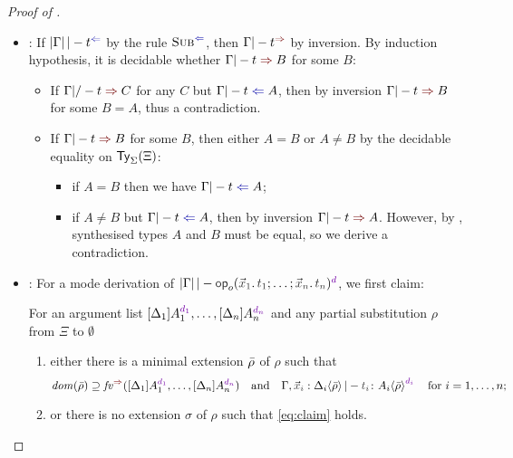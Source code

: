 \begin{proof}[Proof of {}]
\begin{itemize}
    \item {}: If $\erase{\Gamma} |-t^{\chk}$ by the rule $\ChkRule{Sub}$, then $\Gamma |- t^{\syn}$ by inversion.
      By induction hypothesis, it is decidable whether $\Gamma |- t \syn B$ for some $B$:
      \begin{itemize}
        \item If $\Gamma |/- t \syn C$ for any $C$ but $\Gamma |- t \chk A$, then by inversion $\Gamma |- t \syn B$ for some $B = A$, thus a contradiction.
        \item If $\Gamma |- t \syn B$ for some $B$, then either $A = B$ or $A \neq B$ by the decidable equality on $\mathsf{Ty}_{\Sigma}(\Xi)$: 
          \begin{itemize}
            \item if $A = B$ then we have\/ $\Gamma |- t \chk A$;
            \item if $A \neq B$ but $\Gamma |- t \chk A$, then by inversion $\Gamma |- t \syn A$.
              However, by , synthesised types $A$ and $B$ must be equal, so we derive a contradiction.
          \end{itemize}
      \end{itemize}
    \item {}:
      For a mode derivation of $\erase{\Gamma} |- \tmOpts^{\dir{d}}$, we first claim:
      \begin{claim}\label{lem:args-induction}
        For an argument list $\biargs$ and any partial substitution $\rho$ from $\Xi$ to $\emptyset$
        \begin{enumerate}
          \item either there is a minimal extension $\bar{\rho}$ of $\rho$ such that 
            \begin{equation} \label{eq:claim}
              \dom(\ext{\rho}) \supseteq \synvar(\biargs)
              \quad\text{and}\quad
              \Gamma, \vars{x}_\isTerm{i} : \simsub{\Delta_i}{\ext{\rho}} |- \isTerm{t_i} \colon \simsub{A_i}{\ext{\rho}}^{\dir{d_i}}
              \quad\text{for $i = 1, \ldots, n$};
            \end{equation}
          \item or there is no extension $\sigma$ of $\rho$ such that \eqref{eq:claim} holds.
        \end{enumerate}
      \end{claim}


\end{itemize}
\end{proof}
